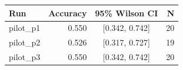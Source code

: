 \begin{tabular}{lrcr}
\toprule
Run & Accuracy & 95\% Wilson CI & N \\
\midrule
pilot_p1 & 0.550 & [0.342, 0.742] & 20 \\
pilot_p2 & 0.526 & [0.317, 0.727] & 19 \\
pilot_p3 & 0.550 & [0.342, 0.742] & 20 \\
\bottomrule
\end{tabular}
